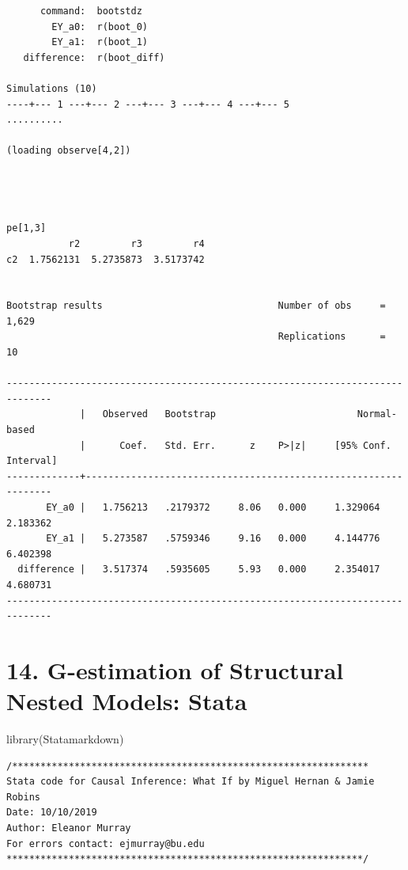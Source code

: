 \documentclass[
  10pt,
]{book}
\newenvironment{Shaded}{\begin{snugshade}}{\end{snugshade}}
\newcommand{\FunctionTok}[1]{\textcolor[rgb]{0.00,0.00,0.00}{#1}}
\newcommand{\NormalTok}[1]{#1}
\begin{document}
\begin{verbatim}
      command:  bootstdz
        EY_a0:  r(boot_0)
        EY_a1:  r(boot_1)
   difference:  r(boot_diff)

Simulations (10)
----+--- 1 ---+--- 2 ---+--- 3 ---+--- 4 ---+--- 5 
..........

(loading observe[4,2])




pe[1,3]
           r2         r3         r4
c2  1.7562131  5.2735873  3.5173742


Bootstrap results                               Number of obs     =      1,629
                                                Replications      =         10

------------------------------------------------------------------------------
             |   Observed   Bootstrap                         Normal-based
             |      Coef.   Std. Err.      z    P>|z|     [95% Conf. Interval]
-------------+----------------------------------------------------------------
       EY_a0 |   1.756213   .2179372     8.06   0.000     1.329064    2.183362
       EY_a1 |   5.273587   .5759346     9.16   0.000     4.144776    6.402398
  difference |   3.517374   .5935605     5.93   0.000     2.354017    4.680731
------------------------------------------------------------------------------
\end{verbatim}

\hypertarget{g-estimation-of-structural-nested-models-stata}{%
\chapter*{14. G-estimation of Structural Nested Models: Stata}\label{g-estimation-of-structural-nested-models-stata}}

\begin{Shaded}
\begin{Highlighting}[]
\FunctionTok{library}\NormalTok{(Statamarkdown)}
\end{Highlighting}
\end{Shaded}

\begin{verbatim}
/***************************************************************
Stata code for Causal Inference: What If by Miguel Hernan & Jamie Robins
Date: 10/10/2019
Author: Eleanor Murray 
For errors contact: ejmurray@bu.edu
***************************************************************/
\end{verbatim}
\end{document}

